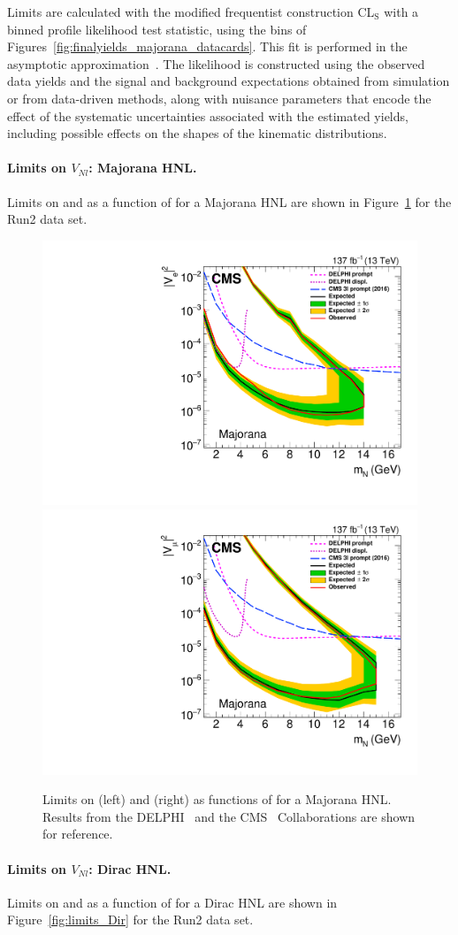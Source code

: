 Limits are calculated with the modified frequentist construction
CL$_{\mathrm{S}}$ with a binned profile likelihood
test statistic, using the bins of Figures~\ref{fig:finalyields_majorana_datacards}.
This fit is performed in the asymptotic approximation~\cite{cowan}.
The likelihood is constructed using the observed data yields and the
signal and background expectations obtained from simulation or from
data-driven methods, along with nuisance parameters that encode the
effect of the systematic uncertainties associated with the estimated
yields, including possible effects on the shapes of the kinematic
distributions.
\paragraph{Limits on $V_{Nl}$: Majorana HNL.}
Limits on \mixpare and \mixparm as a function of \mhnl for a Majorana
HNL are shown in
Figure~\ref{fig:limits_Maj} for the Run2 data set.
\begin{figure}[!ht]
    \centering
    \includegraphics[width=.49\textwidth]{Figures/paper/majorana_ele.pdf}
    \hfill
    \includegraphics[width=.49\textwidth]{Figures/paper/majorana_muo.pdf}
    \caption{\label{fig:limits_Maj}
        Limits on \mixpare (left) and \mixparm (right) as
        functions of \mhnl for a Majorana HNL. Results from the DELPHI~\cite{Abreu:1996pa}
        and the CMS~\cite{Sirunyan:2018mtv} Collaborations are shown
        for reference.
    }
\end{figure}
\paragraph{Limits on $V_{Nl}$: Dirac HNL.}
Limits on \mixpare and \mixparm as a function of \mhnl for a Dirac HNL
are shown in
Figure~\ref{fig:limits_Dir} for the Run2 data set.\\


